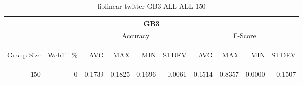 \begin{center}
\begin{table}[htbp] 
 \begin{center}
\begin{tabular}{ | r | r | r | r | r | r | r | r | r | r |}
\hline
\multicolumn{10}{|c|}{GB3}\\
\hline
 & & \multicolumn{4}{|c|}{Accuracy} & \multicolumn{4}{|c|}{F-Score}\\ \cline{3-10}
\begin{sideways}Group Size\end{sideways} & \begin{sideways}Web1T \%\end{sideways} & \begin{sideways}AVG\end{sideways} & \begin{sideways}MAX\end{sideways} & \begin{sideways}MIN\end{sideways} & \begin{sideways}STDEV\end{sideways} & \begin{sideways}AVG\end{sideways} & \begin{sideways}MAX\end{sideways} & \begin{sideways}MIN\end{sideways} & \begin{sideways}STDEV\end{sideways}\\
\hline
\multirow{0}{*}{150}
 & 0 & 0.1739 & 0.1825 & 0.1696 & 0.0061 & 0.1514 & 0.8357 & 0.0000 & 0.1507\\ \cline{2-10}
\hline
\end{tabular}
\caption{liblinear-twitter-GB3-ALL-ALL-150}
\label{table:liblinear-twitter-GB3-ALL-ALL-150}
\end{center}
 \end{table}
\end{center}

